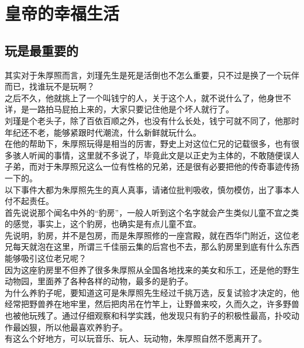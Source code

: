 \section{皇帝的幸福生活}
\ifnum{}
	\begin{multicols}{\theparacolNo}
\fi
\subsection{玩是最重要的}
其实对于朱厚照而言，刘瑾先生是死是活倒也不怎么重要，只不过是换了一个玩伴而已，找谁玩不是玩啊？\\

之后不久，他就挑上了一个叫钱宁的人，关于这个人，就不说什么了，他身世不详，是一路拍马屁拍上来的，大家只要记住他是个坏人就行了。\\

刘瑾是个老头子，除了百依百顺之外，也没有什么长处，钱宁可就不同了，他那时年纪还不老，能够紧跟时代潮流，什么新鲜就玩什么。\\

在他的帮助下，朱厚照玩得是相当的厉害，野史上对这位仁兄的记载很多，也有很多骇人听闻的事情，这里就不多说了，毕竟此文是以正史为主体的，不敢随便误人子弟，而对于朱厚照兄这么一位有性格的兄弟，还是很有必要把他的传奇事迹传扬一下的。\\

以下事件大都为朱厚照先生的真人真事，请诸位批判吸收，慎勿模仿，出了事本人付不起责任。\\

首先说说那个闻名中外的“豹房”，一般人听到这个名字就会产生类似儿童不宜之类的感觉，事实上，这个豹房，也确实是有点儿童不宜。\\

先说明，豹房，并不是包房，而是朱厚照修的一座宫殿，就在西华门附近，这位老兄每天就泡在这里，所谓三千佳丽云集的后宫也不去，那么豹房里到底有什么东西能够吸引这位老兄呢？\\

因为这座豹房里不但养了很多朱厚照从全国各地找来的美女和乐工，还是他的野生动物园，里面养了各种各样的动物，最多的是豹子。\\

为什么养豹子呢，要知道这可是朱厚照先生经过千挑万选，反复试验才决定的，他经常把野兽养在地牢里，然后把肉吊在竹竿上，让野兽来咬，久而久之，许多野兽也被他玩残了。通过仔细观察和科学实践，他发现只有豹子的积极性最高，扑咬动作最凶狠，所以他最喜欢养豹子。\\

有这么个好地方，可以玩音乐、玩人、玩动物，朱厚照自然不愿离开了。\\


\end{multicols}
